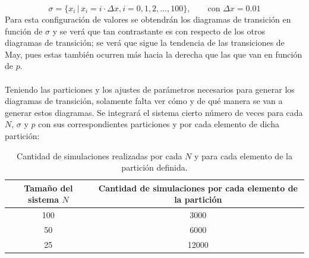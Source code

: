 \begin{equation}\label{eqn:particionSigma}
	\sigma = \{x_i\, |\, x_i=i\cdot\Delta x, i=0,1,2,...,100\},\qquad\text{con }\Delta x=0.01
\end{equation}
Para esta configuración de valores se obtendrán los diagramas de transición en función de $\sigma$ y se verá que tan contrastante es con respecto de los otros diagramas de transición; se verá que sigue la tendencia de las transiciones de May, pues estas también ocurren más hacia la derecha que las que van en función de $p$. \\
\\
Teniendo las particiones y los ajustes de parámetros necesarios para generar los diagramas de transición, solamente falta ver cómo y de qué manera se van a generar estos diagramas. Se integrará el sistema cierto número de veces para cada $N$, $\sigma$ y $p$ con sus correspondientes particiones y por cada elemento de dicha partición:
\begin{table}[h!]
	\centering
	\begin{tabular}{|c|c|}
		\hline
		Tamaño del sistema $N$ & Cantidad de simulaciones por cada elemento de la partición  \\ \hline
		100 & 3000 \\ \hline
		50  & 6000 \\ \hline
		25  & 12000 \\ \hline		
 	\end{tabular}
	\caption{Cantidad de simulaciones realizadas por cada $N$ y para cada elemento de la partición definida.}
	\label{tab:SimulacionesTransicion}
\end{table} 

